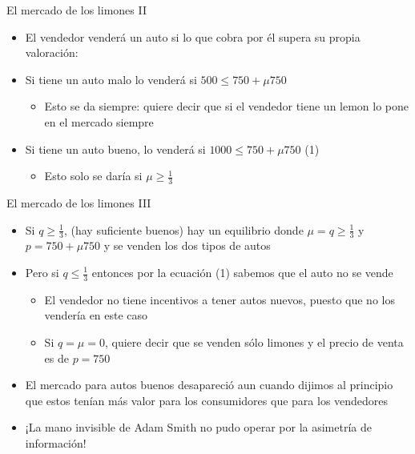 \documentclass{beamer}
\begin{document}
\begin{frame}{El mercado de los limones II}
\begin{itemize}
    \item El vendedor venderá un auto si lo que cobra por él supera su propia valoración:
    \vspace{3mm}
    \item Si tiene un auto malo lo venderá si 
    $500 \leq 750 + \mu 750$
    \begin{itemize}
    \item Esto se da siempre: quiere decir que si el vendedor tiene un lemon lo pone en el mercado siempre
    \end{itemize} \vspace{3mm}
    \item Si tiene un auto bueno, lo venderá si 
    $1000 \leq 750 + \mu 750 $ (1)
    \begin{itemize}
    \item Esto solo se daría si $\mu \geq \frac{1}{3}$
    \end{itemize} \vspace{3mm}
\end{itemize}
\end{frame}

\begin{frame}{El mercado de los limones III}
\begin{itemize}
    \item  Si $ q \geq \frac{1}{3}$, (hay suficiente buenos) hay un equilibrio donde $\mu = q \geq \frac{1}{3}$ y $p= 750 + \mu 750$ y se venden los dos tipos de autos 
    \vspace{1mm}
    \item Pero si $q \leq \frac{1}{3}$ entonces por la ecuación (1) sabemos que el auto no se vende
    \begin{itemize}
    \item El vendedor no tiene incentivos a tener autos nuevos, puesto que no los vendería en este caso
    \item Si $q= \mu = 0 $, quiere decir que se venden sólo limones y el precio de venta es de $p= 750$ 
    \end{itemize}
    \item El mercado para autos buenos desapareció aun cuando dijimos al principio que estos tenían más valor para los consumidores que para los vendedores \vspace{1mm}
    \item ¡La mano invisible de Adam Smith no pudo operar por la asimetría de información!
\end{itemize} 
\end{frame}
\end{document}
